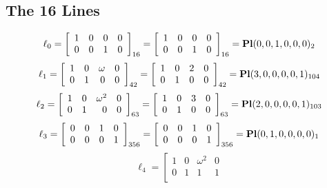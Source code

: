\documentclass{article}
\begin{document}
{\subsection*{The 16 Lines}
$$
\ell_{0} = 
\left[
\begin{array}{*{4}{r}}
1 & 0 & 0 & 0\\
0 & 0 & 1 & 0\\
\end{array}
\right]
_{16}
=
\left[
\begin{array}{*{4}c}
1  & 0  & 0  & 0\\
0  & 0  & 1  & 0\\
\end{array}
\right]_{16}
={\rm\bf Pl}(0,0,1,0,0,0 )_{2}$$
$$
\ell_{1} = 
\left[
\begin{array}{*{4}{r}}
1 & 0 & \omega  & 0\\
0 & 1 & 0 & 0\\
\end{array}
\right]
_{42}
=
\left[
\begin{array}{*{4}c}
1  & 0  & 2  & 0\\
0  & 1  & 0  & 0\\
\end{array}
\right]_{42}
={\rm\bf Pl}(3,0,0,0,0,1 )_{104}$$
$$
\ell_{2} = 
\left[
\begin{array}{*{4}{r}}
1 & 0 & \omega^{2} & 0\\
0 & 1 & 0 & 0\\
\end{array}
\right]
_{63}
=
\left[
\begin{array}{*{4}c}
1  & 0  & 3  & 0\\
0  & 1  & 0  & 0\\
\end{array}
\right]_{63}
={\rm\bf Pl}(2,0,0,0,0,1 )_{103}$$
$$
\ell_{3} = 
\left[
\begin{array}{*{4}{r}}
0 & 0 & 1 & 0\\
0 & 0 & 0 & 1\\
\end{array}
\right]
_{356}
=
\left[
\begin{array}{*{4}c}
0  & 0  & 1  & 0\\
0  & 0  & 0  & 1\\
\end{array}
\right]_{356}
={\rm\bf Pl}(0,1,0,0,0,0 )_{1}$$
$$
\ell_{4} = 
\left[
\begin{array}{*{4}{r}}
1 & 0 & \omega^{2} & 0\\
0 & 1 & 1 & 1\\

\end{array}$$}
\end{document}

